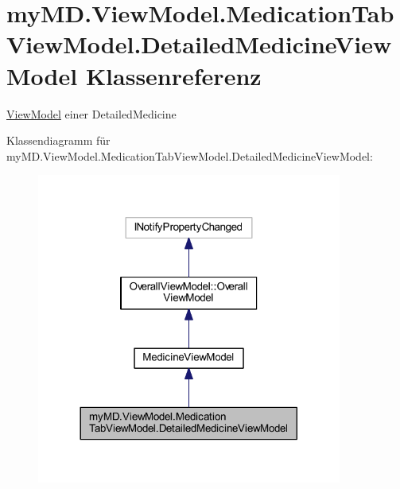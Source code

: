 \hypertarget{classmy_m_d_1_1_view_model_1_1_medication_tab_view_model_1_1_detailed_medicine_view_model}{}\section{my\+M\+D.\+View\+Model.\+Medication\+Tab\+View\+Model.\+Detailed\+Medicine\+View\+Model Klassenreferenz}
\label{classmy_m_d_1_1_view_model_1_1_medication_tab_view_model_1_1_detailed_medicine_view_model}


\mbox{\hyperlink{namespacemy_m_d_1_1_view_model}{View\+Model}} einer Detailed\+Medicine  




Klassendiagramm für my\+M\+D.\+View\+Model.\+Medication\+Tab\+View\+Model.\+Detailed\+Medicine\+View\+Model\+:
\nopagebreak
\begin{figure}[H]
\begin{center}
\leavevmode
\includegraphics[width=284pt]{classmy_m_d_1_1_view_model_1_1_medication_tab_view_model_1_1_detailed_medicine_view_model__inherit__graph}
\end{center}
\end{figure}



